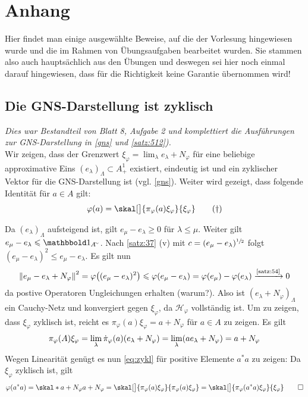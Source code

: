 \cleardoubleoddemptypage
{}
\setcounter{page}{1}
\cleardoubleoddemptypage
\appendix

\section{Anhang} %
\label{sec:anhang}
Hier findet man einige ausgewählte Beweise, auf die der Vorlesung hingewiesen wurde und die im Rahmen von Übungsaufgaben bearbeitet wurden.
Sie stammen also auch hauptsächlich aus den Übungen und deswegen sei hier noch einmal darauf hingewiesen, dass für die Richtigkeit keine Garantie übernommen wird!

\subsection{Die GNS-Darstellung ist zyklisch} %
\label{sub:gns_zyklisch}
\emph{Dies war Bestandteil von Blatt 8, Aufgabe 2 und komplettiert die Ausführungen zur GNS-Darstellung in \autoref{gns} und \autoref{satz:512}).} \smallskip \\
Wir zeigen, dass der Grenzwert $\xi_\varphi = \lim_\lambda e_\lambda + N_\varphi$ für eine beliebige approximative Eins $(e_\lambda)_\Lambda \subset A^1_+$ existiert, eindeutig ist und ein zyklischer Vektor für die GNS-Darstellung ist (vgl. \autoref{gns}).
Weiter wird gezeigt, dass folgende Identität für $a \in A$ gilt:
\begin{equation}
	\varphi(a) = \skal[\big]{\pi_\varphi(a)\xi_\varphi}{\xi_\varphi}
	\label{eq:zykl} \tag{\dag}
\end{equation}
\begin{beweis}
	Da $(e_\lambda)_\Lambda$ aufsteigend ist, gilt $e_\mu - e_\lambda \ge 0$ für $\lambda \le \mu$. 
	Weiter gilt $e_\mu - e_\lambda \le \ind_{A^\simm}$.
	Nach \autoref{satz:37} (v) mit $c=(e_\mu -e_\lambda)^{\sfrac{1}{2}}$ folgt $(e_\mu -e_\lambda)^2 \le e_\mu -e_\lambda$.
	Es gilt nun
	\[
		\norm*{e_\mu - e_\lambda + N_\varphi}^2 = \varphi \enbrace[\big]{(e_\mu-e_\lambda)^2} \le \varphi(e_\mu -e_\lambda)= \varphi(e_\mu)- \varphi(e_\lambda)
		\grenzw{\mbox{\scriptsize\ref{satz:54}}} 0
	\]
	da postive Operatoren Ungleichungen erhalten (warum?).
	Also ist $(e_\lambda +N_\varphi)_\Lambda$ ein Cauchy-Netz und konvergiert gegen $\xi_\varphi$, da $\mathcal{H}_\varphi$ vollständig ist.
	Um zu zeigen, dass $\xi_\varphi$ zyklisch ist, reicht es $\pi_\varphi(a) \xi_\varphi = a + N_\varphi$ für $a \in A$ zu zeigen. Es gilt
	\[
		\pi_\varphi(A) \xi_\varphi = \lim_\lambda \dot{\pi}_\varphi(a) \enbrace*{e_\lambda +N_\varphi} = \lim_\lambda \enbrace*{a e_\lambda + N_\varphi} = a+ N_\varphi
	\]
	Wegen Linearität genügt es nun \eqref{eq:zykl} für positive Elemente $a^*a$ zu zeigen: Da $\xi_\varphi$ zyklisch ist, gilt
	\[
		\varphi(a^*a) = \skal*{a+ N_\varphi}{a+N_\varphi} = \skal[\big]{\pi_\varphi(a) \xi_\varphi}{\pi_\varphi(a)\xi_\varphi} = \skal[\big]{\pi_\varphi(a^*a)\xi_\varphi}{\xi_\varphi}\qedhere
	\]
\end{beweis} 

